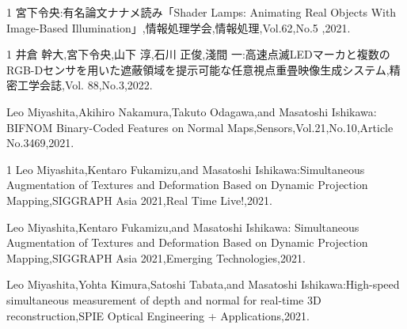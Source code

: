 \begin{著書}{1}
宮下令央:有名論文ナナメ読み「Shader Lamps: Animating Real Objects With Image-Based Illumination」,情報処理学会,情報処理,Vol.62,No.5 ,2021.

\end{著書}

\begin{雑誌論文}{1}
井倉 幹大,宮下令央,山下 淳,石川 正俊,淺間 一:高速点滅LEDマーカと複数のRGB-Dセンサを用いた遮蔽領域を提示可能な任意視点重畳映像生成システム,精密工学会誌,Vol. 88,No.3,2022.

Leo Miyashita,Akihiro Nakamura,Takuto Odagawa,and Masatoshi Ishikawa: BIFNOM Binary-Coded Features on Normal Maps,Sensors,Vol.21,No.10,Article No.3469,2021.

\end{雑誌論文}

\begin{査読付}{1}
Leo Miyashita,Kentaro Fukamizu,and Masatoshi Ishikawa:Simultaneous Augmentation of Textures and Deformation Based on Dynamic Projection Mapping,SIGGRAPH Asia 2021,Real Time Live!,2021.

Leo Miyashita,Kentaro Fukamizu,and Masatoshi Ishikawa: Simultaneous Augmentation of Textures and Deformation Based on Dynamic Projection Mapping,SIGGRAPH Asia 2021,Emerging Technologies,2021.

Leo Miyashita,Yohta Kimura,Satoshi Tabata,and Masatoshi Ishikawa:High-speed simultaneous measurement of depth and normal for real-time 3D reconstruction,SPIE Optical Engineering + Applications,2021.

\end{査読付}

